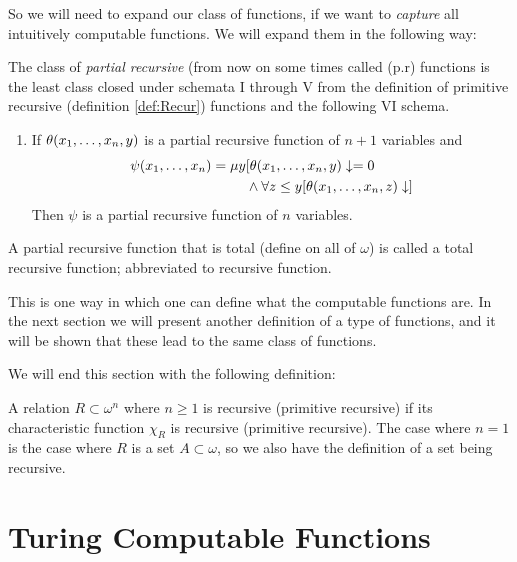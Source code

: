 \documentclass[../main.tex]{subfiles}
\begin{document}
So we will need to expand our class of functions, if we want to
\textit{capture} all intuitively computable functions. 
We will expand them in the following way:
\begin{defi}
		The class of \textit{partial recursive} (from now on some times
		called (p.r) functions is the least class closed under schemata
		I through V from the definition of primitive recursive
		(definition \ref{def:Recur})
		functions and the following VI schema. 
		\begin{enumerate}[label=\Roman*., start=6]
			\item If $\theta(x_1,\ldots,x_n,y)$ is a partial recursive function
				of $n+1$ variables and 
				\begin{align*}
					\psi(x_1,\ldots,x_n)=\mu
					y&[\theta(x_1,\ldots,x_n,y)\downarrow=0\\
						&\wedge \forall z\leq y
					[\theta(x_1,\ldots,x_n,z)\downarrow]
				\end{align*}
				Then $\psi$ is a partial recursive function of
				$n$ variables.
		\end{enumerate}
		A partial recursive function that is total (define on all of
		$\omega$) is called a total
		recursive function; abbreviated to recursive function.
\end{defi}

This is one way in which one can define what the computable functions are. In
the next section we will present another definition of a type of functions,
and it will be shown that these lead to the same class of functions.

We will end this section with the following definition:
\begin{defi}
	A relation $R\subset\omega^n$ where $n\geq 1$ is recursive (primitive
	recursive) if its characteristic function $\chi_R$ is recursive
	(primitive recursive). The case where $n=1$ is the case where $R$ is a
	set $A\subset\omega$, so we also have the definition of a set being
	recursive.
\end{defi}

\section{Turing Computable Functions}
\end{document}
